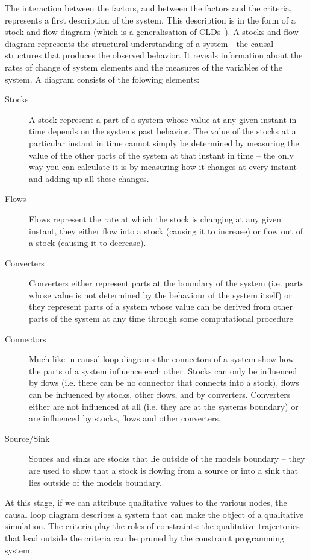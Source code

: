 The interaction between the factors, and between the factors and the
criteria, represents a first description of the system.
%
This description is in the form of a stock-and-flow diagram (which is
a generalisation of \aclp{CLD}~\cite{burns}).
A stocks-and-flow diagram represents the structural 
understanding of a system - the causal structures that
produces the observed behavior. It reveals information about the rates of change
of system elements and the measures of the variables of the system. A diagram
consists of the folowing elements:
\begin{description}
  \item[Stocks] A stock represent a part of a system whose value at any given
  instant in time depends on the systems past behavior. The value of the stocks
  at a particular instant in time cannot simply be determined by measuring the
  value of the other parts of the system at that instant in time – the only way
  you can calculate it is by measuring how it changes at every instant and
  adding up all these changes.
  \item[Flows] Flows represent the rate at which the stock is changing at any
  given instant, they either flow into a stock (causing it to increase) or flow
  out of a stock (causing it to decrease).
  \item[Converters] Converters either represent parts at the boundary of the
  system (i.e. parts whose value is not determined by the behaviour of the
  system itself) or they represent parts of a system whose value can be derived
  from other parts of the system at any time through some computational
  procedure
  \item[Connectors] Much like in causal loop diagrams the connectors of a system
  show how the parts of a system influence each other. Stocks can only be
  influenced by flows (i.e. there can be no connector that connects into a
  stock), flows can be influenced by stocks, other flows, and by converters.
  Converters either are not influenced at all (i.e. they are at the systems
  boundary) or are influenced by stocks, flows and other converters.
  \item[Source/Sink] Souces and sinks are stocks that lie outside of the models
  boundary – they are used to show that a stock is flowing from a source or into
  a sink that lies outside of the models boundary.
\end{description}

At this stage, if we can attribute qualitative values to the various nodes, the
causal loop diagram describes a system that can make the object of a qualitative
simulation. The criteria play the roles of constraints: the qualitative
trajectories that lead outside the criteria can be pruned by the constraint
programming system.

